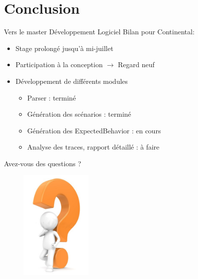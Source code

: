 \documentclass{beamer}
\begin{document}
\section*{Conclusion}
\begin{frame}{Vers le master Développement Logiciel}
		Bilan pour Continental:
	\vspace{-10px}
	\begin{itemize}[<+->]
			\item Stage prolongé jusqu'à mi-juillet
			\item Participation à la conception $\rightarrow$ Regard neuf
			\item Développement de différents modules 
				\begin{itemize}
					\item<3-> Parser : terminé
					\item<3-> Génération des scénarios : terminé
					\item<3-> Génération des ExpectedBehavior : en cours
					\item<3-> Analyse des traces, rapport détaillé : à faire
				\end{itemize}
		\end{itemize}
	\vfill
\end{frame}
\begin{frame}{Avez-vous des questions ?}
	\begin{figure}[H]
		\centering
		\includegraphics[width=3.5cm]{interrogation.jpg}
	\end{figure}
\end{frame}
\end{document}
